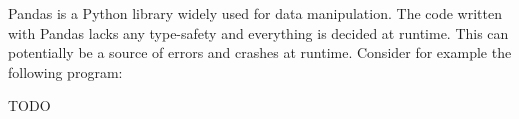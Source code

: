 \Large
Pandas is a Python library widely used for data manipulation. %
The code written with Pandas lacks any type-safety and everything is decided at runtime.
This can potentially be a source of errors and crashes at runtime.
Consider for example the following program:

TODO
